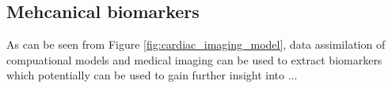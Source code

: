 \subsection{Mehcanical biomarkers}
As can be seen from Figure \ref{fig:cardiac_imaging_model}, data
assimilation of compuational models and medical imaging can be used to
extract biomarkers which potentially can be used to gain further
insight into ...






